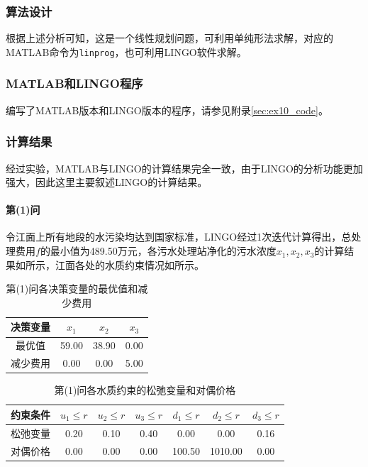 \documentclass[12pt,a4paper]{article}
\begin{document}
\subsubsection{算法设计}

根据上述分析可知，这是一个线性规划问题，可利用单纯形法求解，对应的MATLAB命令为\texttt{linprog}，也可利用LINGO软件求解。

\subsubsection{MATLAB和LINGO程序}

编写了MATLAB版本和LINGO版本的程序，请参见附录\ref{sec:ex10_code}。

\subsubsection{计算结果}

经过实验，MATLAB与LINGO的计算结果完全一致，由于LINGO的分析功能更加强大，因此这里主要叙述LINGO的计算结果。

\paragraph{第(1)问} 令江面上所有地段的水污染均达到国家标准，LINGO经过1次迭代计算得出，总处理费用$f$的最小值为489.50万元，各污水处理站净化的污水浓度$x_1,x_2,x_3$的计算结果如所示，江面各处的水质约束情况如所示。

\begin{table}[H]
    \centering
    \caption{第(1)问各决策变量的最优值和减少费用}
    \label{tab:ex10_result_updown}
    \begin{tabular}{c|ccc}
        \toprule
        决策变量 & \(x_1\) & \(x_2\) & \(x_3\)\tabularnewline
        \midrule
        最优值 & 59.00 & 38.90 & 0.00\tabularnewline
        减少费用 & 0.00 & 0.00 & 5.00\tabularnewline
        \bottomrule
    \end{tabular}
\end{table}

\begin{table}[H]
    \centering
    \caption{第(1)问各水质约束的松弛变量和对偶价格}
    \label{tab:ex10_result_cons_updown}
    \begin{tabular}{c|cccccc}
        \toprule
        约束条件 & \(u_1\le r\) & \(u_2\le r\) & \(u_3 \le r\) & \(d_1 \le r\) &
        \(d_2 \le r\) & \(d_3 \le r\)\tabularnewline
        \midrule
        松弛变量 & 0.20 & 0.10 & 0.40 & 0.00 & 0.00 & 0.16\tabularnewline
        对偶价格 & 0.00 & 0.00 & 0.00 & 100.50 & 1010.00 & 0.00\tabularnewline
        \bottomrule
    \end{tabular}
\end{table}
\end{document}
